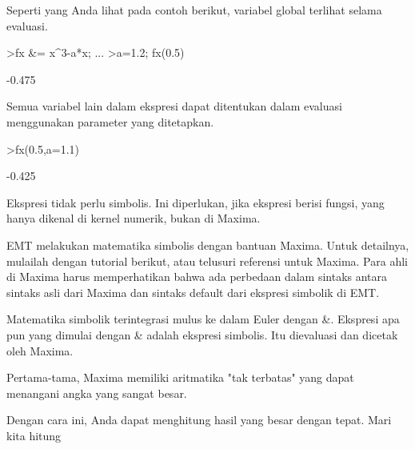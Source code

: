 \documentclass[12pt,arial,letterpaper]{book}
\begin{document}
\begin{eulernootebook}
\begin{eulercomment}
\begin{eulercomment}
\begin{eulernootebook}
\begin{eulercomment}
Seperti yang Anda lihat pada contoh berikut, variabel global terlihat
selama evaluasi.
\end{eulercomment}
\begin{eulerprompt}
>fx &= x^3-a*x;  ...
>a=1.2; fx(0.5)
\end{eulerprompt}
\begin{euleroutput}
  -0.475
\end{euleroutput}
\begin{eulercomment}
Semua variabel lain dalam ekspresi dapat ditentukan dalam evaluasi
menggunakan parameter yang ditetapkan.
\end{eulercomment}
\begin{eulerprompt}
>fx(0.5,a=1.1)
\end{eulerprompt}
\begin{euleroutput}
  -0.425
\end{euleroutput}
\begin{eulercomment}
Ekspresi tidak perlu simbolis. Ini diperlukan, jika ekspresi berisi
fungsi, yang hanya dikenal di kernel numerik, bukan di Maxima.

\begin{eulercomment}
\begin{eulercomment}
EMT melakukan matematika simbolis dengan bantuan Maxima. Untuk
detailnya, mulailah dengan tutorial berikut, atau telusuri referensi
untuk Maxima. Para ahli di Maxima harus memperhatikan bahwa ada
perbedaan dalam sintaks antara sintaks asli dari Maxima dan sintaks
default dari ekspresi simbolik di EMT.

Matematika simbolik terintegrasi mulus ke dalam Euler dengan \&.
Ekspresi apa pun yang dimulai dengan \& adalah ekspresi simbolis. Itu
dievaluasi dan dicetak oleh Maxima.

Pertama-tama, Maxima memiliki aritmatika "tak terbatas" yang dapat
menangani angka yang sangat besar.
\end{eulercomment}
\begin{eulercomment}
Dengan cara ini, Anda dapat menghitung hasil yang besar dengan tepat.
Mari kita hitung


\end{eulercomment}
\end{eulercomment}
\end{eulercomment}
\end{eulernootebook}
\end{eulercomment}
\end{eulercomment}
\end{eulernootebook}
\end{document}
